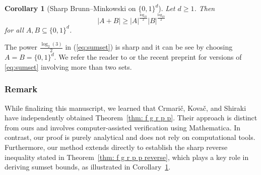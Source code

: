 \documentclass[reqno, 10pt]{amsart}
\theoremstyle{plain}
\numberwithin{equation}{section}
\newtheorem{corollary}[theorem]{Corollary}
\theoremstyle{definition}
\newtheorem*{induction hypothesis}{Induction hypothesis}
\theoremstyle{remark}
\begin{document}
\begin{corollary}[Sharp Brunn--Minkowski on $\{0,1\}^{d}$]\label{sumset01}
    Let $d \geq 1$. Then
    \begin{equation}\label{eq:sumset}
        |A+B| \geq |A|^{\frac{\log_23}{2}}|B|^{\frac{\log_23}{2}}
    \end{equation}
    for all $A,B \subseteq \{0,1\}^d$.
\end{corollary}

The power $\frac{\log_{2}(3)}{2}$ in (\ref{eq:sumset}) is sharp and it can be see by choosing $A=B=\{0,1\}^{d}$.  We refer the reader to \cite{Bourgain} or the recent preprint \cite{BKIM} for versions of \eqref{eq:sumset} involving more than two sets.






\subsubsection*{Remark}  
While finalizing this manuscript, we learned that Crmari\v{c}, Kova\v{c}, and Shiraki \cite{CKS} have independently obtained Theorem~\ref{thm: f g r p p}. Their approach is distinct from ours and involves computer-assisted verification using Mathematica. In contrast, our proof is purely analytical and does not rely on computational tools. Furthermore, our method extends directly to establish the sharp reverse inequality stated in Theorem~\ref{thm: f g r p p reverse}, which plays a key role in deriving sumset bounds, as illustrated in Corollary~\ref{sumset01}.
\end{document}
